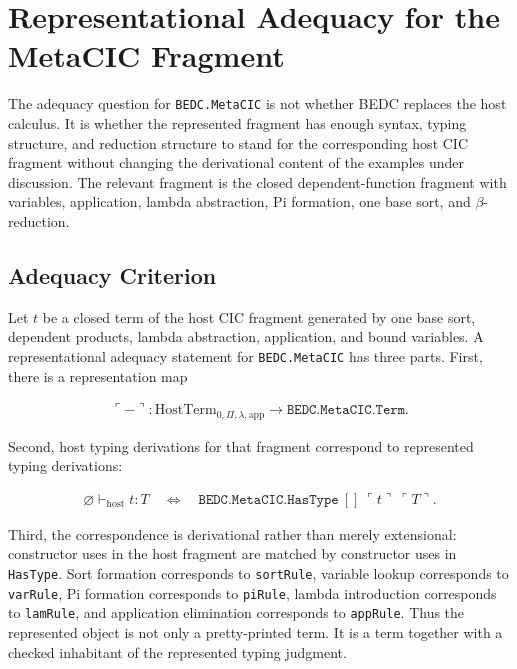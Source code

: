 \section{Representational Adequacy for the MetaCIC Fragment}
\label{sec:self-comp-metacic-representational-adequacy}

The adequacy question for \texttt{BEDC.MetaCIC} is not whether BEDC replaces
the host calculus. It is whether the represented fragment has enough syntax,
typing structure, and reduction structure to stand for the corresponding host
CIC fragment without changing the derivational content of the examples under
discussion. The relevant fragment is the closed dependent-function fragment
with variables, application, lambda abstraction, Pi formation, one base sort,
and $\beta$-reduction.

\subsection{Adequacy Criterion}
\label{subsec:metacic-adequacy-criterion}

Let $t$ be a closed term of the host CIC fragment generated by one base sort,
dependent products, lambda abstraction, application, and bound variables. A
representational adequacy statement for \texttt{BEDC.MetaCIC} has three parts.
First, there is a representation map

$$
\begin{aligned}
\ulcorner - \urcorner :
  \mathrm{HostTerm}_{0,\Pi,\lambda,\mathrm{app}}
  \longrightarrow \texttt{BEDC.MetaCIC.Term}.
\end{aligned}
$$

Second, host typing derivations for that fragment correspond to represented
typing derivations:

$$
\begin{aligned}
\varnothing \vdash_{\mathrm{host}} t : T
\quad\Longleftrightarrow\quad
\texttt{BEDC.MetaCIC.HasType}\ []\ \ulcorner t \urcorner\ \ulcorner T \urcorner .
\end{aligned}
$$

Third, the correspondence is derivational rather than merely extensional:
constructor uses in the host fragment are matched by constructor uses in
\texttt{HasType}. Sort formation corresponds to \texttt{sortRule}, variable
lookup corresponds to \texttt{varRule}, Pi formation corresponds to
\texttt{piRule}, lambda introduction corresponds to \texttt{lamRule}, and
application elimination corresponds to \texttt{appRule}. Thus the represented
object is not only a pretty-printed term. It is a term together with a checked
inhabitant of the represented typing judgment.

